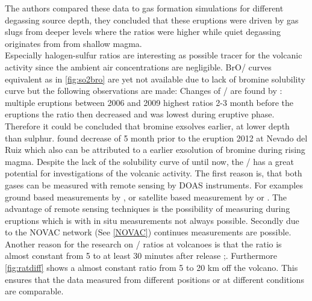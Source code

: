 \documentclass  [
  paper    = a4,
  BCOR     = 10mm,
  twoside,
  fontsize = 12pt,
  fleqn,
  toc      = bibnumbered,
  toc      = listofnumbered,
  numbers  = noendperiod,
  headings = normal,
  listof   = leveldown,
  version  = 3.03
]                                       {scrreprt}
\begin{document}
	The authors compared these data to gas formation simulations for different degassing source depth, they concluded that these eruptions were driven by gas slugs from deeper levels where the ratios were higher while quiet degassing originates from from shallow magma.\\
	Especially halogen-sulfur ratios are interesting as possible tracer for the volcanic activity since the ambient air concentrations are negligible.
	BrO/  curves equivalent as in \cref{fig:so2bro} are yet not available due to lack of  bromine solubility curve but the following observations are made:
	Changes of /  are found by \citet{bobrowski2006bromine}: multiple eruptions between 2006 and 2009 highest ratios 2-3 month before the eruptions the ratio then decreased and was lowest during eruptive phase. Therefore it could be concluded that bromine exsolves earlier, at lower depth than sulphur.
	\citet{lubcke2014bro} found decrease of   5 month prior to the eruption 2012 at Nevado del Ruiz which also can be attributed to a earlier exsolution of bromine during rising magma.
	Despite the lack of the solubility curve of   until now, the /  has a great potential for investigations of the volcanic activity. The first reason is, that both gases can be measured with remote sensing by DOAS instruments. For examples ground based measurements by \citet{bobrowski2007reactive}, \citet{lubcke2014optical} or satellite based measurement by \citet{hormann2013systematic} or \citet{beirle2014estimating}. The advantage of remote sensing techniques is the possibility of measuring during eruptions which is with in situ measurements not always possible.
	Secondly due to the NOVAC network (See \ref{NOVAC}) continues measurements are possible.\\
	Another reason for the research on /  ratios at volcanoes is that the ratio is almost constant from 5 to at least 30 minutes after release \citep{bobrowski2007reactive};\citep{lubcke2014optical}. Furthermore \cref{fig:ratdiff} shows a almost constant ratio from 5 to 20 km off the volcano. This ensures that the data measured from different positions or at different conditions are comparable.\\
	\\
	
\end{document}
